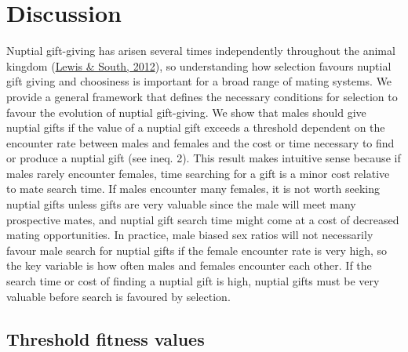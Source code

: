 \documentclass[
]{article}
\begin{document}
\hypertarget{discussion}{%
\section{Discussion}\label{discussion}}

Nuptial gift-giving has arisen several times independently throughout
the animal kingdom (\protect\hyperlink{ref-Lewis2012}{Lewis \& South,
2012}), so understanding how selection favours nuptial gift giving and
choosiness is important for a broad range of mating systems. We provide
a general framework that defines the necessary conditions for selection
to favour the evolution of nuptial gift-giving. We show that males
should give nuptial gifts if the value of a nuptial gift exceeds a
threshold dependent on the encounter rate between males and females and
the cost or time necessary to find or produce a nuptial gift (see ineq.
2). This result makes intuitive sense because if males rarely encounter
females, time searching for a gift is a minor cost relative to mate
search time. If males encounter many females, it is not worth seeking
nuptial gifts unless gifts are very valuable since the male will meet
many prospective mates, and nuptial gift search time might come at a
cost of decreased mating opportunities. In practice, male biased sex
ratios will not necessarily favour male search for nuptial gifts if the
female encounter rate is very high, so the key variable is how often
males and females encounter each other. If the search time or cost of
finding a nuptial gift is high, nuptial gifts must be very valuable
before search is favoured by selection.

\hypertarget{threshold-fitness-values}{%
\subsection{Threshold fitness values}\label{threshold-fitness-values}}
\end{document}

